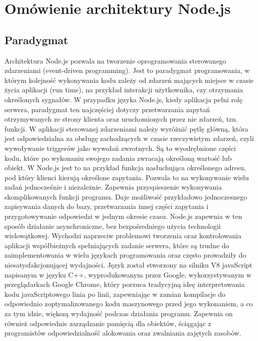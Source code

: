 \documentclass[12pt]{report}
\begin{document}
\chapter{Omówienie architektury Node.js}

\section{Paradygmat}
Architektura Node.js pozwala na tworzenie oprogramowania sterowanego zdarzeniami (event-driven programming). 
Jest to paradygmat programowania, w którym kolejność wykonywania kodu zależy od zdarzeń mających miejsce w czasie życia aplikacji (run time), na przykład interakcji użytkownika, czy otrzymania określonych sygnałów. 
W przypadku języka Node.js, kiedy aplikacja pełni rolę serwera, paradygmat ten najczęściej dotyczy przetwarzania zapytań otrzymywanych ze strony klienta oraz uruchomionych przez nie zdarzeń, tzn. funkcji. 
W aplikacji sterowanej zdarzeniami należy wyróżnić pętlę główną, która jest odpowiedzialna za obsługę zachodzących w czasie rzeczywistym zdarzeń, czyli wywoływanie triggerów jako wywołań zwrotnych. 
Są to wyodrębnione części kodu, które po wykonaniu swojego zadania zwracają określoną wartość lub obiekt. 
W Node.js jest to na przykład funkcja nasłuchująca określonego adresu, pod który klienci kierują określone zapytania. 
Pozwala to na wykonywanie wielu zadań jednocześnie i niezależnie. 
Zapewnia przyspieszenie wykonywania skomplikowanych funkcji programu. 
Daje możliwość przykładowo jednoczesnego zapisywania danych do bazy, przetwarzania innej części zapytania i przygotowywanie odpowiedzi w jednym okresie czasu. 
Node.js zapewnia w ten sposób działanie asynchroniczne, bez bezpośredniego użycia technologii wielowątkowej. 
Wychodzi naprzeciw problemowi tworzenia oraz kontrolowania aplikacji współbieżnych spełniających zadanie serwera, które są trudne do zaimplementowania w wielu językach programowania oraz często prowadziły do niesatysfakcjonującej wydajności. 
Język został stworzony na silniku V8 javaScript napisanym w języku C++, wyprodukowanym przez Google, wykorzystywanym w przeglądarkach Google Chrome, który porzuca tradycyjną ideę interpretowania kodu javaScriptowego linia po linii, zapewniając w zamian kompilacje do odpowiednio zoptymalizowanego kodu maszynowego przed jego wykonaniem, a co za tym idzie, większą wydajność podczas działania programu. 
Zapewnia on również odpowiednie zarządzanie pamięcią dla obiektów, ściągając z programistów odpowiedzialność alokowania oraz zwalniania zajętych zasobów.
\end{document}
